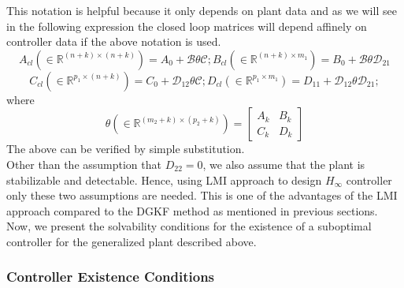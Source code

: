 \documentclass[a4paper,12pt]{article}
\begin{document}
		This notation is helpful because it only depends on plant data and as we will see in the following expression the closed loop matrices will depend affinely on controller data if the above notation is used.
		\[
		A_{cl} (\in \mathbb{R}^{(n+k) \times (n+k)})=A_{0}+\mathscr{B}\theta\mathscr{C};
		B_{cl}(\in \mathbb{R}^{(n+k) \times m_{1}})=B_{0}+\mathscr{B}\theta\mathscr{D}_{21}
		\]
		\[
		C_{cl}(\in \mathbb{R}^{p_{1} \times (n+k)})=C_{0}+\mathscr{D}_{12}\theta\mathscr{C};
		D_{cl}(\in \mathbb{R}^{p_{1} \times m_{1}})=D_{11}+\mathscr{D}_{12}\theta\mathscr{D}_{21};
		\]
		where 
		\[
		\theta (\in \mathbb{R}^{(m_{2}+k) \times (p_{2}+k)})= \begin{bmatrix}
		A_{k} & B_{k} \\ C_{k} & D_{k}
		\end{bmatrix}
		\]
		The above can be verified by simple substitution. \\
		Other than the assumption that $D_{22}=0$, we also assume that the plant is stabilizable and detectable. Hence, using LMI approach to design $H_{\infty}$ controller only these two assumptions are needed. This is one of the advantages of the LMI approach compared to the DGKF method as mentioned in previous sections. Now, we present the solvability conditions for the existence of a suboptimal controller for the generalized plant described above.
		\subsubsection{Controller Existence Conditions}
\end{document}
